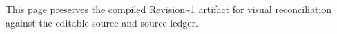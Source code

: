 This page preserves the compiled Revision\textasciitilde{}1 artifact for visual reconciliation against the editable source and source ledger.
